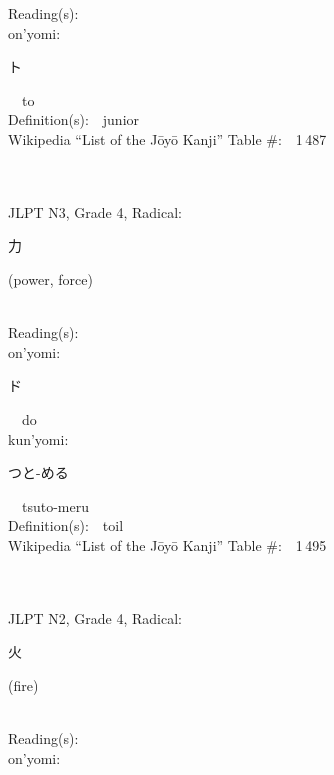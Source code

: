 \begin{multicols}{2}
Reading(s):\ \ \\
{\hspace*{1em}}on'yomi:\ \ \\
{\hspace*{2em}}{\begin{CJK}{UTF8}{min} ト \end{CJK}}\ \ to\ \ \\
Definition(s):\ \ junior \\
Wikipedia ``List of the J\=oy\=o Kanji'' Table \#:\ \ 1\,487 \\
\ \ \\
{\fontsize{34pt}{40pt}  }\ \ \\  %
{JLPT N3, Grade 4, Radical:\ \ {\begin{CJK}{UTF8}{min} 力 \end{CJK}} (power, force) } \\
Reading(s):\ \ \\
{\hspace*{1em}}on'yomi:\ \ \\
{\hspace*{2em}}{\begin{CJK}{UTF8}{min} ド \end{CJK}}\ \ do\ \ \\
{\hspace*{1em}}kun'yomi:\ \ \\
{\hspace*{2em}}{\begin{CJK}{UTF8}{min} つと-める \end{CJK}}\ \ tsuto-meru\ \ \\
Definition(s):\ \ toil \\
Wikipedia ``List of the J\=oy\=o Kanji'' Table \#:\ \ 1\,495 \\
\ \ \\
{\fontsize{34pt}{40pt}  }\ \ \\  %
{JLPT N2, Grade 4, Radical:\ \ {\begin{CJK}{UTF8}{min} 火 \end{CJK}} (fire) } \\
Reading(s):\ \ \\
{\hspace*{1em}}on'yomi:\ \ \\

\end{multicols}
